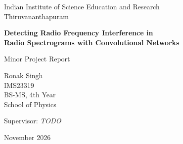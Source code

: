 \documentclass[12pt,a4paper,oneside]{report}
\begin{document}
\begin{titlepage}
  \centering
  \vspace*{1cm}
  {\Large Indian Institute of Science Education and Research\\Thiruvananthapuram\par}
  \vspace{2cm}
  {\huge\bfseries Detecting Radio Frequency Interference in\\[0.3em]
   Radio Spectrograms with Convolutional Networks\par}
  \vspace{1.5cm}
  {\Large Minor Project Report\par}
  \vspace{2cm}
  {\large Ronak Singh\\IMS23319\\BS-MS, 4th Year\\School of Physics\par}
  \vspace{1.5cm}
  {\large Supervisor: \textit{TODO}\par}
  \vfill
  {\large November 2026\par}  %
\end{titlepage}


\end{document}
